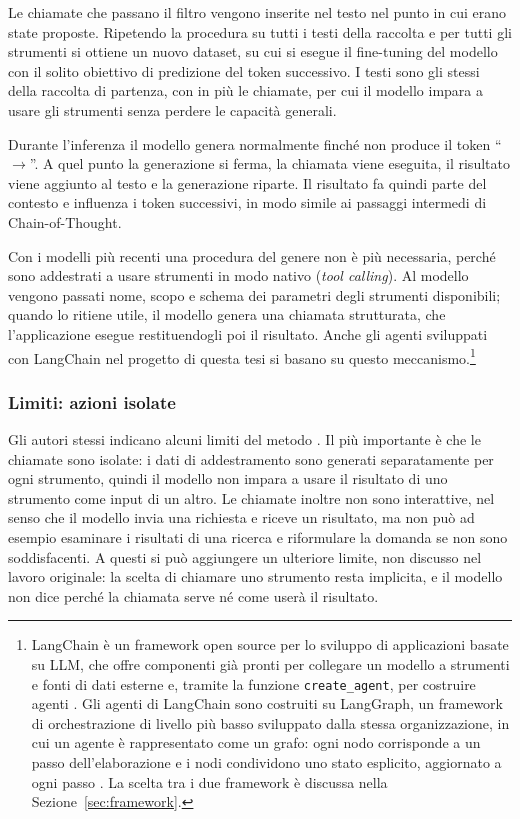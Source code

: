 Le chiamate che passano il filtro vengono inserite nel testo nel punto in cui erano state proposte. Ripetendo la procedura su tutti i testi della raccolta e per tutti gli strumenti si ottiene un nuovo dataset, su cui si esegue il fine-tuning del modello con il solito obiettivo di predizione del token successivo. I testi sono gli stessi della raccolta di partenza, con in più le chiamate, per cui il modello impara a usare gli strumenti senza perdere le capacità generali.

Durante l'inferenza il modello genera normalmente finché non produce il token ``$\rightarrow$''. A quel punto la generazione si ferma, la chiamata viene eseguita, il risultato viene aggiunto al testo e la generazione riparte. Il risultato fa quindi parte del contesto e influenza i token successivi, in modo simile ai passaggi intermedi di Chain-of-Thought.

Con i modelli più recenti una procedura del genere non è più necessaria, perché sono addestrati a usare strumenti in modo nativo (\emph{tool calling}). Al modello vengono passati nome, scopo e schema dei parametri degli strumenti disponibili; quando lo ritiene utile, il modello genera una chiamata strutturata, che l'applicazione esegue restituendogli poi il risultato. Anche gli agenti sviluppati con LangChain nel progetto di questa tesi si basano su questo meccanismo.\footnote{LangChain è un framework open source per lo sviluppo di applicazioni basate su LLM, che offre componenti già pronti per collegare un modello a strumenti e fonti di dati esterne e, tramite la funzione \texttt{create\_agent}, per costruire agenti \cite{langchainoverview}. Gli agenti di LangChain sono costruiti su LangGraph, un framework di orchestrazione di livello più basso sviluppato dalla stessa organizzazione, in cui un agente è rappresentato come un grafo: ogni nodo corrisponde a un passo dell'elaborazione e i nodi condividono uno stato esplicito, aggiornato a ogni passo \cite{langgraphgithub,langchainv1}. La scelta tra i due framework è discussa nella Sezione~\ref{sec:framework}.}

\subsubsection{Limiti: azioni isolate}

Gli autori stessi indicano alcuni limiti del metodo \cite{schick2023toolformer}. Il più importante è che le chiamate sono isolate: i dati di addestramento sono generati separatamente per ogni strumento, quindi il modello non impara a usare il risultato di uno strumento come input di un altro. Le chiamate inoltre non sono interattive, nel senso che il modello invia una richiesta e riceve un risultato, ma non può ad esempio esaminare i risultati di una ricerca e riformulare la domanda se non sono soddisfacenti. A questi si può aggiungere un ulteriore limite, non discusso nel lavoro originale: la scelta di chiamare uno strumento resta implicita, e il modello non dice perché la chiamata serve né come userà il risultato.

